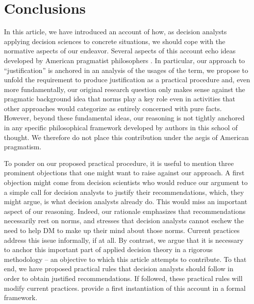 \documentclass[preprint, french, english, 11pt, authoryear]{elsarticle}%
\begin{document}
\section{Conclusions}
\label{sec:concl}
In this article, we have introduced an account of how, as decision analysts applying decision sciences to concrete situations, we should cope with the normative aspects of our endeavor. %
Several aspects of this account echo ideas developed by American pragmatist philosophers \citep{ormerod_history_2006}. 
In particular, our approach to ``justification'' is anchored in an analysis of the usages of the term, we propose to unfold the requirement to produce justification as a practical procedure and, even more fundamentally, 
our original research question only makes sense against the pragmatic background idea that norms play a key role even in activities that other approaches would categorize as entirely concerned with pure facts.
However, beyond these fundamental ideas, our reasoning is not tightly anchored in any specific philosophical framework developed by authors in this school of thought.
We therefore do not place this contribution under the aegis of American pragmatism.


To ponder on our proposed practical procedure, it is useful to mention three prominent objections that one might want to raise against our approach. A first objection might come from decision scientists who would reduce our argument to a simple call for decision analysts to justify their recommendations, which, they might argue, is what decision analysts already do. This would miss an important aspect of our reasoning. Indeed, our rationale emphasizes that recommendations necessarily rest on norms, and stresses that decision analysts cannot eschew the need to help DM%
 to make up their mind about those norms. Current practices address this issue informally, if at all. By contrast, we argue that it is necessary to anchor this important part of applied decision theory in a rigorous methodology -- an objective to which this article attempts to contribute. To that end, we have proposed practical rules that decision analysts should follow in order to obtain justified recommendations. If followed, these practical rules will modify current practices. \citet{cailloux_formal_2018} provide a first instantiation of this account in a formal framework.
\end{document}
